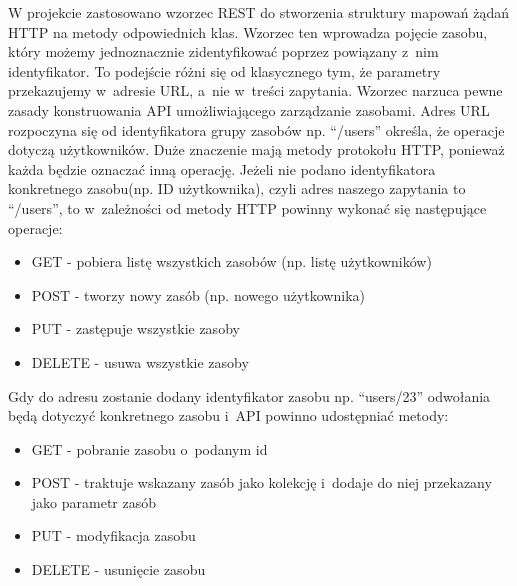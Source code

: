 W projekcie zastosowano wzorzec REST do stworzenia struktury mapowań żądań HTTP na metody odpowiednich klas. Wzorzec ten wprowadza pojęcie zasobu, który możemy jednoznacznie zidentyfikować poprzez powiązany z~nim identyfikator. To podejście różni się od klasycznego tym, że parametry przekazujemy w~adresie URL, a~nie w~treści zapytania. Wzorzec narzuca pewne zasady konstruowania API umożliwiającego zarządzanie zasobami. Adres URL rozpoczyna się od identyfikatora grupy zasobów np. “/users” określa, że operacje dotyczą użytkowników. Duże znaczenie mają metody protokołu HTTP, ponieważ każda będzie oznaczać inną operację. Jeżeli nie podano identyfikatora konkretnego zasobu(np. ID użytkownika), czyli adres naszego zapytania to “/users”, to w~zależności od metody HTTP powinny wykonać się następujące operacje:

\begin{itemize}
\item GET - pobiera listę wszystkich zasobów (np. listę użytkowników)
\item POST - tworzy nowy zasób (np. nowego użytkownika)
\item PUT - zastępuje wszystkie zasoby
\item DELETE - usuwa wszystkie zasoby
\end{itemize}

Gdy do adresu zostanie dodany identyfikator zasobu np. “users/23” odwołania będą dotyczyć konkretnego zasobu i~API powinno udostępniać metody:

\begin{itemize}
\item GET - pobranie zasobu o~podanym id
\item POST - traktuje wskazany zasób jako kolekcję i~dodaje do niej przekazany jako parametr zasób
\item PUT - modyfikacja zasobu
\item DELETE - usunięcie zasobu
\end{itemize}


